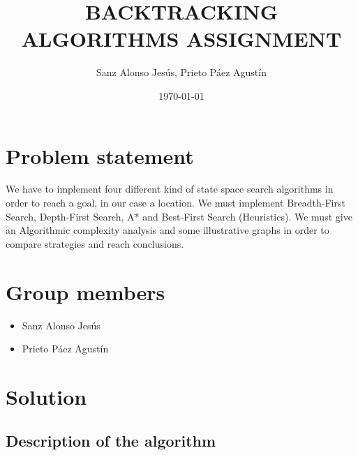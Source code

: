 \documentclass{article}
\title{BACKTRACKING ALGORITHMS ASSIGNMENT}
\author{Sanz Alonso Jesús, Prieto Páez Agustín}
\date{\today}
\begin{document}
\pagestyle{fancy}
\fancyfoot[C]{\thepage}
\maketitle
\tableofcontents

\section{Problem statement}
We have to implement four different kind of state space search algorithms in order to reach a goal, in our case a location. We must implement Breadth-First Search, Depth-First Search, A* and Best-First Search (Heuristics). We must give an Algorithmic complexity analysis and some illustrative graphs in order to compare strategies and reach conclusions.

\section{Group members}
\begin{itemize}
	\item Sanz Alonso Jesús
	\item Prieto Páez Agustín
\end{itemize}

\section{Solution}
\subsection{Description of the algorithm}
\end{document}
